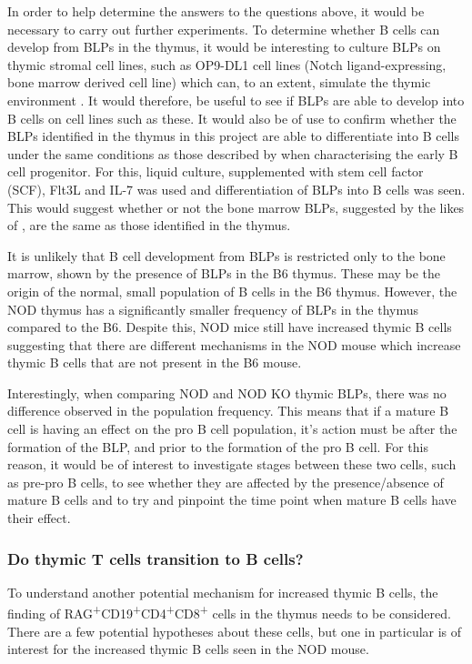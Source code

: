 In order to help determine the answers to the questions above, it would be necessary to carry out further experiments.
To determine whether B cells can develop from BLPs in the thymus, it would be interesting to culture BLPs on thymic stromal cell lines, such as OP9-DL1 cell lines (Notch ligand-expressing, bone marrow derived cell line) which can, to an extent, simulate the thymic environment \citep{Holmes2009}.
It would therefore, be useful to see if BLPs are able to develop into B cells on cell lines such as these.
It would also be of use to confirm whether the BLPs identified in the thymus in this project are able to differentiate into B cells under the same conditions as those described by \citet{Inlay2009} when characterising the early B cell progenitor.
For this, liquid culture, supplemented with stem cell factor (SCF), Flt3L and IL-7 was used and differentiation of BLPs into B cells was seen.
This would suggest whether or not the bone marrow BLPs, suggested by the likes of \citet{Inlay2009}, are the same as those identified in the thymus.

It is unlikely that B cell development from BLPs is restricted only to the bone marrow, shown by the presence of BLPs in the B6 thymus.
These may be the origin of the normal, small population of B cells in the B6 thymus.
However, the NOD thymus has a significantly smaller frequency of BLPs in the thymus compared to the B6.
Despite this, NOD mice still have increased thymic B cells suggesting that there are different mechanisms in the NOD mouse which increase thymic B cells that are not present in the B6 mouse.

Interestingly, when comparing NOD and NOD KO thymic BLPs, there was no difference observed in the population frequency.
This means that if a mature B cell is having an effect on the pro B cell population, it's action must be after the formation of the BLP, and prior to the formation of the pro B cell.
For this reason, it would be of interest to investigate stages between these two cells, such as pre-pro B cells, to see whether they are affected by the presence/absence of mature B cells and to try and pinpoint the time point when mature B cells have their effect.

\subsubsection{Do thymic T cells transition to B cells?}

To understand another potential mechanism for increased thymic B cells, the finding of RAG\textsuperscript{+}CD19\textsuperscript{+}CD4\textsuperscript{+}CD8\textsuperscript{+} cells in the thymus needs to be considered.
There are a few potential hypotheses about these cells, but one in particular is of interest for the increased thymic B cells seen in the NOD mouse.

